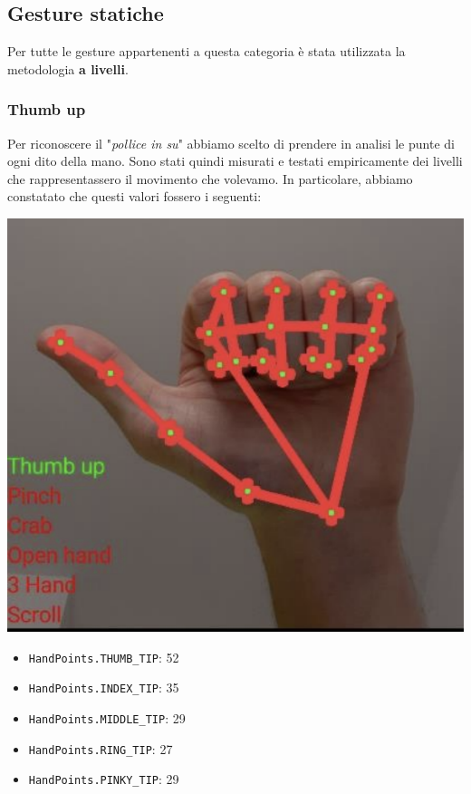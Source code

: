 \subsection{Gesture statiche}
Per tutte le gesture appartenenti a questa categoria è stata utilizzata la metodologia \textbf{a livelli}.
\subsubsection{Thumb up}
Per riconoscere il "\textit{pollice in su}" abbiamo scelto di prendere in analisi le punte di ogni dito della mano. Sono stati quindi misurati e testati empiricamente dei livelli che rappresentassero il movimento che volevamo. 
In particolare, abbiamo constatato che questi valori fossero i seguenti:
\begin{multicols}{2}
    \begin{multicolfigure}
        \centering
        \includegraphics[width=\textwidth]{images/thumb_up.png}
    \end{multicolfigure}
    \columnbreak
    \begin{itemize}
        \item \texttt{HandPoints.THUMB\_TIP}: 52
        \item \texttt{HandPoints.INDEX\_TIP}: 35
        \item \texttt{HandPoints.MIDDLE\_TIP}: 29
        \item \texttt{HandPoints.RING\_TIP}: 27
        \item \texttt{HandPoints.PINKY\_TIP}: 29
    \end{itemize} 
\end{multicols}

